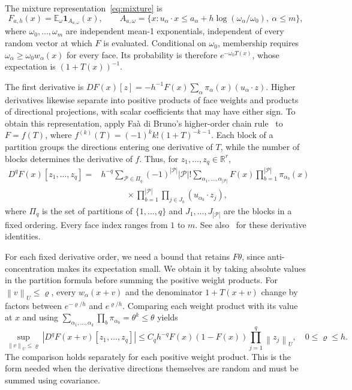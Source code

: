 \documentclass[11pt,letterpaper]{article}
\theoremstyle{remark}
\newcommand{\E}{\mathbb E}
\newcommand{\R}{\mathbb R}
\newcommand{\norm}[1]{\left\lVert#1\right\rVert}
\newcommand{\ind}{\mathbf 1}
\begin{document}
The mixture representation~\eqref{eq:mixture} is
\[
 F_{a,h}(x)=\E_\omega\ind_{A_{a,\omega}}(x),\qquad
 A_{a,\omega}=\{x:u_\alpha\cdot x\le
 a_\alpha+h\log(\omega_\alpha/\omega_0),\ \alpha\le m\},
\]
where \(\omega_0,\ldots,\omega_m\) are independent mean-1
exponentials, independent of every random vector at which \(F\) is
evaluated. Conditional on \(\omega_0\), membership requires
\(\omega_\alpha\ge\omega_0w_\alpha(x)\) for every face.
Its probability is therefore \(e^{-\omega_0T(x)}\), whose
expectation is \((1+T(x))^{-1}\).

The first derivative is
\(DF(x)[z]=-h^{-1}F(x)\sum_\alpha\pi_\alpha(x)(u_\alpha\cdot z)\).
Higher derivatives likewise separate into positive products of face
weights and products of directional projections, with scalar coefficients
that may have either sign. To obtain this representation, apply
Fa\`a di Bruno's higher-order chain rule~\cite{Comtet1974}
to \(F=f(T)\), where
\(f^{(k)}(T)=(-1)^k k!(1+T)^{-k-1}\). Each block of a partition
groups the directions entering one derivative of \(T\), while the
number of blocks determines the derivative of \(f\). Thus, for
\(z_1,\ldots,z_q\in\R^r\),
\begin{equation}
 \begin{split}
 D^qF(x)[z_1,\ldots,z_q]
 ={}&h^{-q}\sum_{\mathcal P\in\Pi_q}(-1)^{|\mathcal P|}|\mathcal P|!
 \sum_{\alpha_1,\ldots,\alpha_{|\mathcal P|}}
 F(x)\prod_{b=1}^{|\mathcal P|}\pi_{\alpha_b}(x)\\
 &\hspace{3em}\times
 \prod_{b=1}^{|\mathcal P|}\prod_{j\in J_b}
 (u_{\alpha_b}\cdot z_j),
 \end{split}
 \label{appx-eq:partition-derivative}
\end{equation}
where \(\Pi_q\) is the set of partitions of \(\{1,\ldots,q\}\)
and \(J_1,\ldots,J_{|\mathcal P|}\) are the blocks in a fixed
ordering. Every face index ranges from \(1\) to \(m\).
See also~\cite[Lemma~13]{GaoZhang} for these derivative identities.

For each fixed derivative order, we need a bound that retains
\(F\theta\), since anti-concentration makes its expectation small.
We obtain it by taking absolute values in the partition formula
before summing the positive weight products.
For \(\norm v_U\le\varrho\), every \(w_\alpha(x+v)\) and the
denominator \(1+T(x+v)\) change by factors between
\(e^{-\varrho/h}\) and \(e^{\varrho/h}\). Comparing each weight
product with its value at \(x\) and using
\(\sum_{\alpha_1,\ldots,\alpha_k}\prod_b\pi_{\alpha_b}
=\theta^k\le\theta\) yields
\begin{equation}
 \sup_{\norm v_U\le\varrho}|D^qF(x+v)[z_1,\ldots,z_q]|
 \le C_qh^{-q}F(x)(1-F(x))\prod_{j=1}^q\norm{z_j}_U,
 \quad 0\le\varrho\le h.
 \label{appx-eq:local-envelope}
\end{equation}
The comparison holds separately for each positive weight product.
This is the form needed when the derivative directions themselves
are random and must be summed using covariance.
\end{document}
